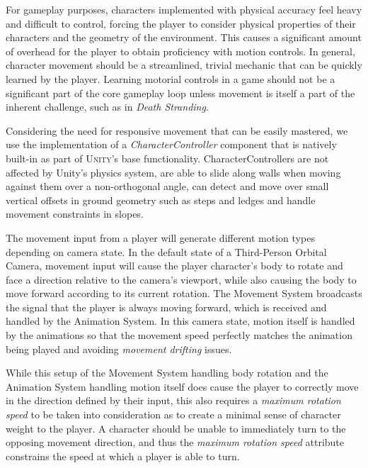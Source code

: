 For gameplay purposes, characters implemented with physical accuracy feel heavy and difficult to control, forcing the player to consider  physical properties of their characters and the geometry of the environment. This causes a significant amount of overhead for the player to obtain proficiency with motion controls. In general, character movement should be a streamlined, trivial mechanic that can be quickly learned by the player. Learning motorial controls in a game should not be a significant part of the core gameplay loop unless movement is itself a part of the inherent challenge, such as in \emph{Death Stranding}.

Considering the need for responsive movement that can be easily mastered, we use the implementation of a \emph{CharacterController} component that is natively built-in as part of \textsc{Unity}'s base functionality. CharacterControllers are not affected by Unity's physics system, are able to slide along walls when moving against them over a non-orthogonal angle, can detect and move over small vertical offsets in ground geometry such as steps and ledges and handle movement constraints in slopes.

The movement input from a player will generate different motion types depending on camera state. In the default state of a Third-Person Orbital Camera, movement input will cause the player character's body to rotate and face a direction relative to the camera's viewport, while also causing the body to move forward according to its current rotation. The Movement System broadcasts the signal that the player is always moving forward, which is received and handled by the Animation System. In this camera state, motion itself is handled by the animations so that the movement speed perfectly matches the animation being played and avoiding \emph{movement drifting} issues.

While this setup of the Movement System handling body rotation and the Animation System handling motion itself does cause the player to correctly move in the direction defined by their input, this also requires a \emph{maximum rotation speed} to be taken into consideration as to create a minimal sense of character weight to the player. A character should be unable to immediately turn to the opposing movement direction, and thus the \emph{maximum rotation speed} attribute constrains the speed at which a player is able to turn.

